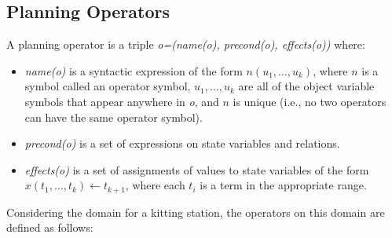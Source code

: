\subsection{Planning Operators}

\begin{defn} A planning operator is a triple \textit{o=(name(o), precond(o), effects(o))}
where:
\begin{itemize}
\item \textit{name(o)} is a syntactic expression of the form $n(u_1,\dots,u_k)$, where $n$ is a symbol
called an operator symbol, $u_1,\dots,u_k$ are all of the object variable symbols that
appear anywhere in \textit{o}, and $n$ is unique (i.e., no two operators can have the
same operator symbol).
\item \textit{precond(o)} is a set of expressions on state variables and relations.
\item \textit{effects(o)} is a set of assignments of values to state variables of the form
$x(t_1,\dots,t_k)\leftarrow t_{k+1}$, where each $t_i$ is a term in the appropriate range.
\end{itemize}
\end{defn}

Considering the domain for a kitting station, the operators on this domain are defined as follows:

